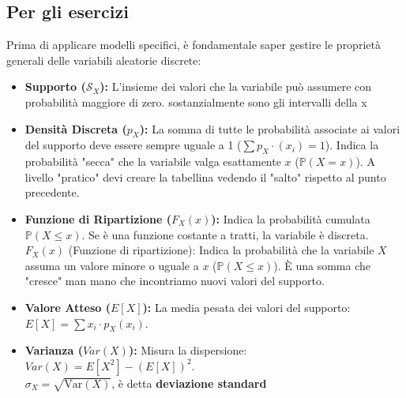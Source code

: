 \documentclass[12pt]{extarticle} %
\begin{document}
\subsection{Per gli esercizi}
Prima di applicare modelli specifici, è fondamentale saper gestire le proprietà generali delle variabili aleatorie discrete:

\begin{itemize}
    \item \textbf{Supporto ($\mathcal{S}_X$):} L'insieme dei valori che la variabile può assumere con probabilità maggiore di zero. {\footnotesize sostanzialmente sono gli intervalli della x}
    \item \textbf{Densità Discreta ($p_X$):} La somma di tutte le probabilità associate ai valori del supporto deve essere sempre uguale a 1 ($\sum p_X \cdot(x_i) = 1$). {\footnotesize  Indica la probabilità "secca" che la variabile valga esattamente $x$ ($\mathbb{P}(X = x)$). A livello "pratico" devi creare la tabellina vedendo il "salto" rispetto al punto precedente.}
    \item \textbf{Funzione di Ripartizione ($F_X(x)$):} Indica la probabilità cumulata $\mathbb{P}(X \le x)$. Se è una funzione costante a tratti, la variabile è discreta. {\footnotesize $F_X(x)$ (Funzione di ripartizione): Indica la probabilità che la variabile $X$ assuma un valore minore o uguale a $x$ ($\mathbb{P}(X \le x)$). È una somma che "cresce" man mano che incontriamo nuovi valori del supporto.}
    \item \textbf{Valore Atteso ($E[X]$):} La media pesata dei valori del supporto: $E[X] = \sum x_i \cdot p_X(x_i)$.
    \item \textbf{Varianza ($Var(X)$):} Misura la dispersione: $Var(X) = E[X^2] - (E[X])^2$. \\  $\sigma_X = \sqrt{\mathrm{Var}(X)}$, è detta \textbf{deviazione standard}
\end{itemize}
\end{document}
